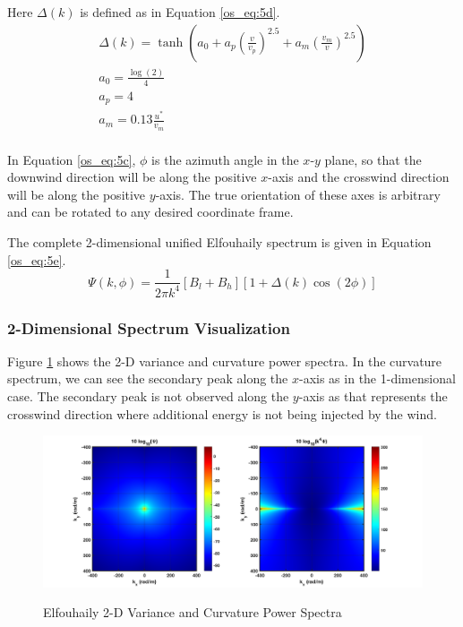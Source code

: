 Here $\Delta(k)$ is defined as in Equation \ref{os_eq:5d}.
\begin{equation}
\label{os_eq:5d}
\begin{gathered}
\Delta(k) = \tanh\left( a_0 + a_p\left(\frac{v}{v_p}\right)^{2.5}  + a_m\left(\frac{v_m}{v} \right)^{2.5}\right)\\
a_0 = \frac{\log(2)}{4} \\
a_p = 4\\
a_m = 0.13\frac{u^*}{v_m} \\
\end{gathered}
\end{equation}
\renewcommand{\baselinestretch}{2} \small\normalsize

In Equation \ref{os_eq:5c}, $\phi$ is the azimuth angle in the $x$-$y$ plane, so that the downwind direction will be along the positive $x$-axis and the crosswind direction will be along the positive $y$-axis. The true orientation of these axes is arbitrary and can be rotated to any desired coordinate frame.

The complete 2-dimensional unified Elfouhaily spectrum is given in Equation \ref{os_eq:5e}.
\begin{equation}
\label{os_eq:5e}
\boxed{\Psi(k,\phi) = \frac{1}{2\pi k^4}\left[B_l + B_h \right] \left[1 + \Delta(k)\cos(2\phi) \right]}
\end{equation}

\subsubsection{2-Dimensional Spectrum Visualization}
Figure \ref{os_fig:7bb} shows the 2-D variance and curvature power spectra. In the curvature spectrum, we can see the secondary peak along the $x$-axis as in the 1-dimensional case. The secondary peak is not observed along the $y$-axis as that represents the crosswind direction where additional energy is not being injected by the wind.
\begin{figure}[H]
  \begin{center}
\includegraphics[width=6in]{../media/Ocean_Surface/elf_variance_curvature_spectrum_2D.png}
  \end{center}
  \renewcommand{\baselinestretch}{1} \small\normalsize
  \begin{quote}
    \caption[Elfouhaily 2-D Variance and Curvature Power Spectra]{Elfouhaily 2-D Variance and Curvature Power Spectra\label{os_fig:7bb}}
  \end{quote}
\end{figure}
\renewcommand{\baselinestretch}{2} \small\normalsize

